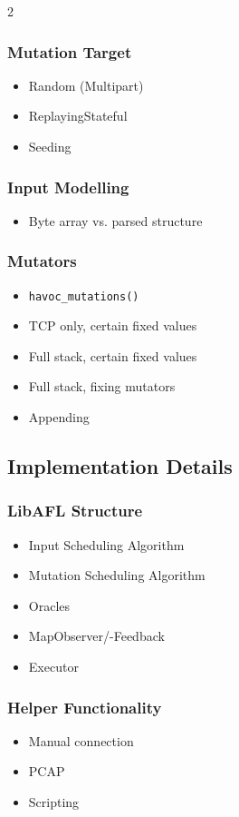 \documentclass{article}
\newcommand{\code}[2][]{\lstinline[language=#1, breaklines=false, basicstyle=\ttfamily\normalsize]{#2}}
\begin{document}
\begin{multicols}{2}
  \subsubsection{Mutation Target}
  \begin{itemize}
    \item Random (Multipart)
    \item ReplayingStateful
    \item Seeding
  \end{itemize}

  \subsubsection{Input Modelling}
  \begin{itemize}
    \item Byte array vs. parsed structure
  \end{itemize}

  \subsubsection{Mutators}
  \begin{itemize}
    \item \code[Rust]{havoc_mutations()}
    \item TCP only, certain fixed values
    \item Full stack, certain fixed values
    \item Full stack, fixing mutators
    \item Appending
  \end{itemize}

  \subsection{Implementation Details}
  \subsubsection{LibAFL Structure}
  \begin{itemize}
    \item Input Scheduling Algorithm
    \item Mutation Scheduling Algorithm
    \item Oracles
    \item MapObserver/-Feedback
    \item Executor
  \end{itemize}

  \subsubsection{Helper Functionality}
  \begin{itemize}
    \item Manual connection
    \item PCAP
    \item Scripting
  \end{itemize}


\end{multicols}
\end{document}
